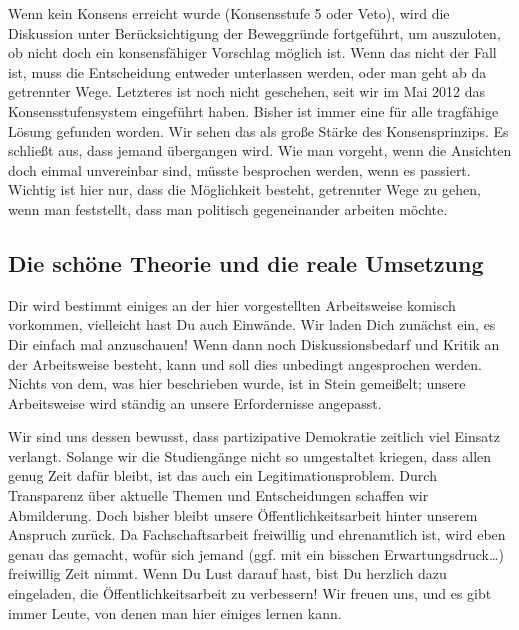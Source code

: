 Wenn kein Konsens erreicht wurde (Konsensstufe 5 oder Veto), wird die Diskussion unter Berücksichtigung der Beweggründe fortgeführt, um auszuloten, ob nicht doch ein konsensfähiger Vorschlag möglich ist. Wenn das nicht der Fall ist, muss die Entscheidung entweder unterlassen werden, oder man geht ab da getrennter Wege. Letzteres ist noch nicht geschehen, seit wir im Mai 2012 das Konsensstufensystem eingeführt haben.
Bisher ist immer eine für alle tragfähige Lösung gefunden worden. Wir sehen das als große Stärke des Konsensprinzips. Es schließt aus, dass jemand übergangen wird. Wie man vorgeht, wenn die Ansichten doch einmal unvereinbar sind, müsste besprochen werden, wenn es passiert. Wichtig ist hier nur, dass die Möglichkeit besteht, getrennter Wege zu gehen, wenn man feststellt, dass man politisch gegeneinander arbeiten möchte.

\vspace*{\parskip}\null

\noindent\framebox{\parbox{\textwidth}{}}

\subsection*{Die schöne Theorie und die reale Umsetzung}

Dir wird bestimmt einiges an der hier vorgestellten Arbeitsweise komisch vorkommen, vielleicht hast Du auch Einwände. Wir laden Dich zunächst ein, es Dir einfach mal anzuschauen! Wenn dann noch Diskussionsbedarf und Kritik an der Arbeitsweise besteht, kann und soll dies unbedingt angesprochen werden. Nichts von dem, was hier beschrieben wurde, ist in Stein gemeißelt; unsere Arbeitsweise wird ständig an unsere Erfordernisse angepasst.

Wir sind uns dessen bewusst, dass partizipative Demokratie zeitlich viel Einsatz verlangt. Solange wir die Studiengänge nicht so umgestaltet kriegen, dass allen genug Zeit dafür bleibt, ist das auch ein Legitimationsproblem. Durch Transparenz über aktuelle Themen und Entscheidungen schaffen wir Abmilderung. Doch bisher bleibt unsere Öffentlichkeitsarbeit hinter unserem Anspruch zurück. Da Fachschaftsarbeit freiwillig und ehrenamtlich ist, wird eben genau das gemacht, wofür sich jemand (ggf. mit ein bisschen Erwartungsdruck\dots) freiwillig Zeit nimmt. Wenn Du Lust darauf hast, bist Du herzlich dazu eingeladen, die Öffentlichkeitsarbeit zu verbessern! Wir freuen uns, und es gibt immer Leute, von denen man hier einiges lernen kann.


